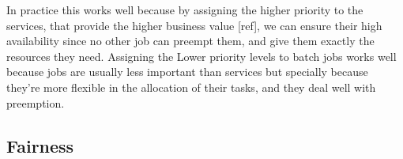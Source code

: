 \documentclass{svjour3}                     %
\begin{document}
In practice this works well because by assigning the higher priority
to the services, that provide the higher business value [ref], we can
ensure their high availability since no other job can preempt them,
and give them exactly the resources they need. Assigning the Lower
priority levels to batch jobs works well because jobs are usually less
important than services but specially because they're more flexible in
the allocation of their tasks, and they deal well with preemption.






\subsection{Fairness}
\end{document}
